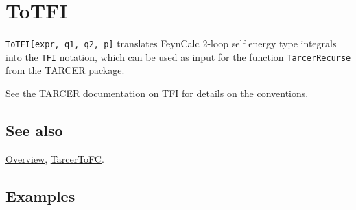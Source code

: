 \documentclass[../FeynCalcManual.tex]{subfiles}
\begin{document}
\hypertarget{totfi}{%
\section{ToTFI}\label{totfi}}

\texttt{ToTFI[\allowbreak{}expr,\ \allowbreak{}q1,\ \allowbreak{}q2,\ \allowbreak{}p]}
translates FeynCalc 2-loop self energy type integrals into the
\texttt{TFI} notation, which can be used as input for the function
\texttt{TarcerRecurse} from the TARCER package.

See the TARCER documentation on TFI for details on the conventions.

\subsection{See also}

\hyperlink{toc}{Overview}, \hyperlink{tarcertofc}{TarcerToFC}.

\subsection{Examples}
\end{document}
